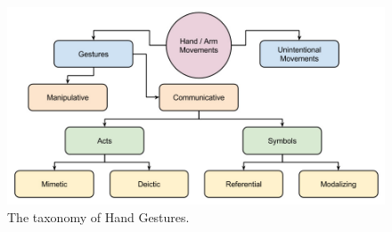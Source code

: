 \begin{figure}
	[h] \centering 
	\includegraphics[width=120mm]{figures/content/ges-tax.jpg} \caption{The taxonomy of Hand Gestures. \cite{1}} \label{fg:ges:tax} 
\end{figure}
